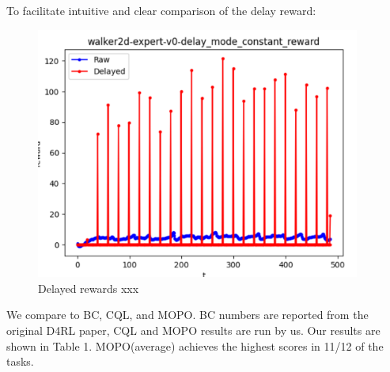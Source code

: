 To facilitate intuitive and clear comparison of the delay reward:
\begin{figure}[H]
    \centering
    \includegraphics[width=0.95\textwidth]{assets/image.png}
    \caption{Delayed rewards xxx}
    \label{fig:fig1}
\end{figure}


We compare to BC, CQL, and MOPO. BC numbers are reported from the original D4RL paper, CQL and MOPO results are run by us. Our results are shown in Table 1. MOPO(average) achieves the highest scores in 11/12 of the tasks.


